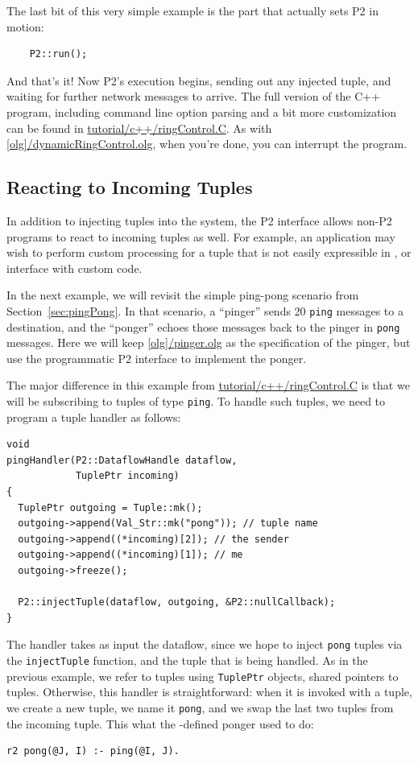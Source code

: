 \documentclass{article}
\begin{document}
The last bit of this very simple example is the part that actually sets
P2 in motion:
\begin{verbatim}
    P2::run();
\end{verbatim}
And that's it! Now P2's execution begins, sending out any injected
tuple, and waiting for further network messages to arrive. The full
version of the C++ program, including command line option parsing and a
bit more customization can be found in \url{tutorial/c++/ringControl.C}. As with
\url{[olg]/dynamicRingControl.olg}, when you're done, you can interrupt
the program.


\subsection{Reacting to Incoming Tuples}

In addition to injecting tuples into the system, the P2 interface allows
non-P2 programs to react to incoming tuples as well. For example, an
application may wish to perform custom processing for a tuple that is
not easily expressible in \ol, or interface with custom code.

In the next example, we will revisit the simple ping-pong scenario from
Section~\ref{sec:pingPong}. In that scenario, a ``pinger'' sends 20
\lstinline$ping$ messages to a destination, and the ``ponger'' echoes
those messages back to the pinger in \lstinline$pong$ messages.  Here we
will keep \url{[olg]/pinger.olg} as the \ol specification of the
pinger, but use the programmatic P2 interface to implement the ponger.

The major difference in this example from
\url{tutorial/c++/ringControl.C} is that we will be subscribing to
tuples of type \lstinline$ping$.  To handle such tuples, we need to
program a tuple handler as follows:
\begin{verbatim}
void
pingHandler(P2::DataflowHandle dataflow,
            TuplePtr incoming)
{
  TuplePtr outgoing = Tuple::mk();
  outgoing->append(Val_Str::mk("pong")); // tuple name
  outgoing->append((*incoming)[2]); // the sender
  outgoing->append((*incoming)[1]); // me
  outgoing->freeze();

  P2::injectTuple(dataflow, outgoing, &P2::nullCallback);
}
\end{verbatim}
The handler takes as input the dataflow, since we hope to inject
\lstinline$pong$ tuples via the \texttt{injectTuple} function, and the
tuple that is being handled. As in the previous example, we refer to
tuples using \texttt{TuplePtr} objects, shared pointers to
tuples. Otherwise, this handler is straightforward: when it is invoked
with a tuple, we create a new tuple, we name it \lstinline$pong$, and we
swap the last two tuples from the incoming tuple. This what the
\ol-defined ponger used to do:
\begin{lstlisting}
r2 pong(@J, I) :- ping(@I, J).
\end{lstlisting}
\end{document}
